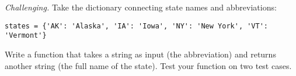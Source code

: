 \documentclass[11pt]{exam}
\begin{document}
\begin{questions}
\item {\it Challenging.\/}
Take the dictionary connecting state names and abbreviations:
\begin{verbatim}
states = {'AK': 'Alaska', 'IA': 'Iowa', 'NY': 'New York', 'VT': 'Vermont'}
\end{verbatim}
Write a function that takes a string as input (the abbreviation)
and returns another string (the full name of the state).
Test your function on two test cases.


\end{questions}
\end{document}

